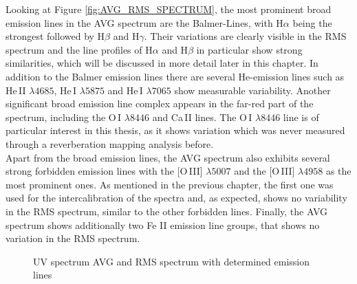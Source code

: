 Looking at Figure \ref{fig:AVG_RMS_SPECTRUM}, the most prominent broad emission lines in the AVG spectrum are the Balmer-Lines, with H$\alpha$ being the strongest followed by H$\beta$ and H$\gamma$. Their variations are clearly visible in the RMS spectrum and the line profiles of H$\alpha$ and H$\beta$ in particular show strong similarities, which will be discussed in more detail later in this chapter. In addition to the Balmer emission lines there are several He-emission lines such as He\,II $\lambda 4685$, He\,I $\lambda 5875$ and He\,I $\lambda 7065$ show measurable variability. Another significant broad emission line complex appears in the far-red part of the spectrum, including the O\,I $\lambda 8446$ and Ca\,II lines. The O\,I $\lambda 8446$ line is of particular interest in this thesis, as it shows variation which was never measured through a reverberation mapping analysis before. \\
Apart from the broad emission lines, the AVG spectrum also exhibits several strong forbidden emission lines with the [O\,III] $\lambda 5007$ and the [O\,III] $\lambda 4958$ as the most prominent ones. As mentioned in the previous chapter, the first one was used for the intercalibration of the spectra and, as expected, shows no variability in the RMS spectrum, similar to the other forbidden lines. Finally, the AVG spectrum shows additionally two Fe II emission line groups, that shows no variation in the RMS spectrum.

\begin{figure}[!htbp]
	\centering
	\caption{UV spectrum AVG and RMS spectrum with determined emission lines}
	\label{fig:UV_uncalibrated_AVG_RMS}
\end{figure}


